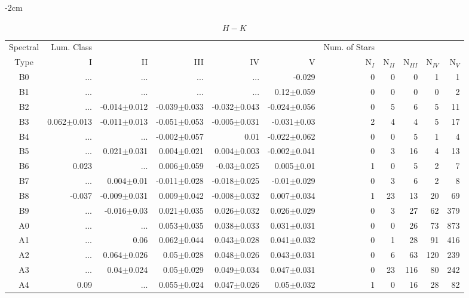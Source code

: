 \begin{table}[t]
\tiny
\centering
\caption{$H-K$}
\begin{center}
    \addtolength{\leftskip} {-2cm}
    \addtolength{\rightskip}{-2cm}
    \begin{tabular}{c|rrrrr|rrrrr}
    \toprule
    Spectral & Lum. Class & & & & & Num. of Stars & & & &  \\
    Type & I & II & III &  IV & V & N$_{I}$ & N$_{II}$ & N$_{III}$ & N$_{IV}$ & N$_{V}$ \\ \midrule
  
B0	&	 ...	&	 ...	&	 ...	&	 ...	&	-0.029	&	0	&	0	&	0	&	1	&	1	\\
B1	&	 ...	&	 ...	&	 ...	&	 ...	&	0.12$\pm$0.059	&	0	&	0	&	0	&	0	&	2	\\
B2	&	 ...	&	-0.014$\pm$0.012	&	-0.039$\pm$0.033	&	-0.032$\pm$0.043	&	-0.024$\pm$0.056	&	0	&	5	&	6	&	5	&	11	\\
B3	&	0.062$\pm$0.013	&	-0.011$\pm$0.013	&	-0.051$\pm$0.053	&	-0.005$\pm$0.031	&	-0.031$\pm$0.03	&	2	&	4	&	4	&	5	&	17	\\
B4	&	 ...	&	 ...	&	-0.002$\pm$0.057	&	0.01	&	-0.022$\pm$0.062	&	0	&	0	&	5	&	1	&	4	\\
B5	&	 ...	&	0.021$\pm$0.031	&	0.004$\pm$0.021	&	0.004$\pm$0.003	&	-0.002$\pm$0.041	&	0	&	3	&	16	&	4	&	13	\\
B6	&	0.023	&	 ...	&	0.006$\pm$0.059	&	-0.03$\pm$0.025	&	0.005$\pm$0.01	&	1	&	0	&	5	&	2	&	7	\\
B7	&	 ...	&	0.004$\pm$0.01	&	-0.011$\pm$0.028	&	-0.018$\pm$0.025	&	-0.01$\pm$0.029	&	0	&	3	&	6	&	2	&	8	\\
B8	&	-0.037	&	-0.009$\pm$0.031	&	0.009$\pm$0.042	&	-0.008$\pm$0.032	&	0.007$\pm$0.034	&	1	&	23	&	13	&	20	&	69	\\
B9	&	 ...	&	-0.016$\pm$0.03	&	0.021$\pm$0.035	&	0.026$\pm$0.032	&	0.026$\pm$0.029	&	0	&	3	&	27	&	62	&	379	\\
A0	&	 ...	&	 ...	&	0.053$\pm$0.035	&	0.038$\pm$0.033	&	0.031$\pm$0.031	&	0	&	0	&	26	&	73	&	873	\\
A1	&	 ...	&	0.06	&	0.062$\pm$0.044	&	0.043$\pm$0.028	&	0.041$\pm$0.032	&	0	&	1	&	28	&	91	&	416	\\
A2	&	 ...	&	0.064$\pm$0.026	&	0.05$\pm$0.028	&	0.048$\pm$0.026	&	0.043$\pm$0.031	&	0	&	6	&	63	&	120	&	239	\\
A3	&	 ...	&	0.04$\pm$0.024	&	0.05$\pm$0.029	&	0.049$\pm$0.034	&	0.047$\pm$0.031	&	0	&	23	&	116	&	80	&	242	\\
A4	&	0.09	&	 ...	&	0.055$\pm$0.024	&	0.047$\pm$0.026	&	0.05$\pm$0.032	&	1	&	0	&	16	&	28	&	82	\\

\end{tabular}
\end{center}
\end{table}
